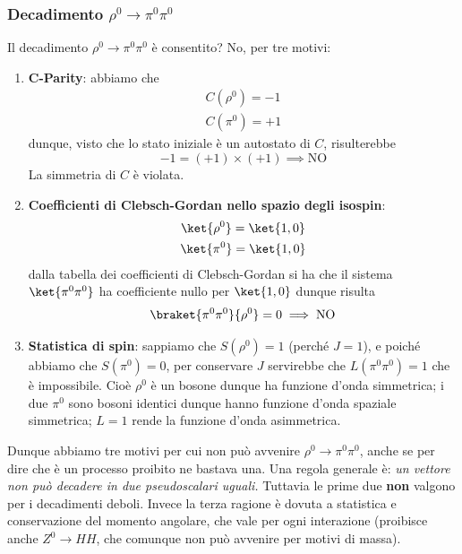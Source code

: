 \subsubsection{Decadimento $\rho^0\to\pi^0\pi^0$}
Il decadimento $\rho^0\to\pi^0\pi^0$ è consentito? No, per tre motivi:
\begin{enumerate}
\item \textbf{C-Parity}: abbiamo che 
\begin{gather*}
C(\rho^0)=-1\\
C(\pi^0)=+1
\end{gather*}
dunque, visto che lo stato iniziale è un autostato di $C$, risulterebbe
\begin{equation*}
-1=(+1)\times(+1)\implies \text{NO}
\end{equation*}
La simmetria di $C$ è violata.
\item \textbf{Coefficienti di Clebsch-Gordan nello spazio degli isospin}: 
\begin{gather*}
\ket{\rho^0}=\ket{1,0}\\
\ket{\pi^0}=\ket{1,0}
\end{gather*}
dalla tabella dei coefficienti di Clebsch-Gordan si ha che il sistema $\ket{\pi^0\pi^0}$ ha coefficiente nullo per $\ket{1,0}$ dunque risulta
\begin{equation*}
\braket{\pi^0\pi^0}{\rho^0}=0\implies \text{NO}
\end{equation*}
\item \textbf{Statistica di spin}: sappiamo che $S(\rho^0)=1$ (perché $J=1$), e poiché abbiamo che $S(\pi^0)=0$, per conservare $J$ servirebbe che $L(\pi^0\pi^0)=1$ che è impossibile. Cioè $\rho^0$ è un bosone dunque ha funzione d'onda simmetrica; i due $\pi^0$ sono bosoni identici dunque hanno funzione d'onda spaziale simmetrica; $L=1$ rende la funzione d'onda asimmetrica.
\end{enumerate}
Dunque abbiamo tre motivi per cui non può avvenire $\rho^0\to\pi^0\pi^0$, anche se per dire che è un processo proibito ne bastava una. Una regola generale è: \textit{ un vettore non può decadere in due pseudoscalari uguali.} Tuttavia le prime due \textbf{non} valgono per i decadimenti deboli. Invece la terza ragione è dovuta a statistica e conservazione del momento angolare, che vale per ogni interazione (proibisce anche $Z^0\to HH$, che comunque non può avvenire per motivi di massa).
